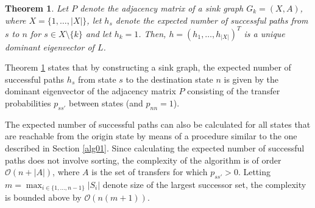 \documentclass[dissertation,draft*]{aaltoseries}
\newtheorem{theorem}{Theorem}
\begin{document}
\begin{theorem}
\label{polut2}
Let $P$ denote the adjacency matrix of a sink graph $G_k=(X,A)$, where $X=\{1,\ldots,|X|\}$,  
let $h_s$ denote the expected number of successful paths from $s$ to $n$ for $s \in X \setminus \{k\}$ and let $h_k=1$. 
Then, $h=(h_1,\ldots,h_{|X|})^T$ is a unique dominant eigenvector of $L$.
\end{theorem}

Theorem \ref{polut2} states that by constructing a sink graph, the expected number of successful paths $h_s$ from state 
$s$ to the destination state $n$
is given by the dominant eigenvector of the adjacency matrix $P$ consisting of the transfer probabilities $p_{ss'}$
between states (and $p_{nn}=1$). 


The expected number of successful paths can also be calculated for all states that are reachable from the 
origin state by means of a procedure similar to the one described in Section \ref{alg01}.
Since calculating the expected number of successful paths does not involve sorting, the complexity of the algorithm 
is of order $\mathcal{O}(n+|A|)$, where $A$ is the set of transfers for which $p_{ss'} > 0$.
Letting $m = \max_{i \in \{1,\ldots,n-1\}} |S_i|$ denote size of the largest successor set, the complexity
is bounded above by $\mathcal{O}(n(m+1))$.
\end{document}
